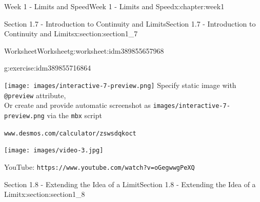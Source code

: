 \documentclass[oneside,10pt,]{book}
\newcommand{\mono}[1]{\texttt{#1}}
\numberwithin{equation}{section}
\newlength{\qrsize}
\newlength{\previewwidth}
\begin{document}
\begin{chapterptx}{Week 1 - Limits and Speed}{}{Week 1 - Limits and Speed}{}{}{x:chapter:week1}
\begin{sectionptx}{Section 1.7 - Introduction to Continuity and Limits}{}{Section 1.7 - Introduction to Continuity and Limits}{}{}{x:section:section1_7}
\begin{worksheet-subsection}{Worksheet}{}{Worksheet}{}{}{g:worksheet:idm389855657968}
\begin{divisionexercise}{3}{}{}{g:exercise:idm389855716864}
\begin{tcbraster}[raster columns=2, raster column skip=1pt, raster halign=center, raster force size=false, raster left skip=0pt, raster right skip=0pt]
\begin{tcolorbox}[previewstyle, width=\previewwidth]%
%
{\texttt{[image: images/interactive-7-preview.png]}}%
{\small{}Specify static image with \mono{@preview} attribute,\\Or create and provide automatic screenshot as \mono{images/interactive-7-preview.png} via the \mono{mbx} script}%
\end{tcolorbox}%
\begin{tcolorbox}[qrstyle]%
{\hypersetup{urlcolor=black}}%
\end{tcolorbox}%
\begin{tcolorbox}[captionstyle]%
\small \mono{www.desmos.com/calculator/zswsdqkoct}\end{tcolorbox}%
\end{tcbraster}%
%
\end{divisionexercise}%
\end{worksheet-subsection}
\restoregeometry
\setlength{\qrsize}{9em}
\setlength{\previewwidth}{\linewidth}
\addtolength{\previewwidth}{-\qrsize}
\begin{tcbraster}[raster columns=2, raster column skip=1pt, raster halign=center, raster force size=false, raster left skip=0pt, raster right skip=0pt]%
\begin{tcolorbox}[previewstyle, width=\previewwidth]%
\texttt{[image: images/video-3.jpg]}%
\end{tcolorbox}%
\begin{tcolorbox}[qrstyle]%
{\hypersetup{urlcolor=black}}%
\end{tcolorbox}%
\begin{tcolorbox}[captionstyle]%
\small YouTube: \mono{https://www.youtube.com/watch?v=oGegwwgPeXQ}\end{tcolorbox}%
\end{tcbraster}%
\end{sectionptx}
%
%
\typeout{************************************************}
\typeout{************************************************}
%
\begin{sectionptx}{Section 1.8 - Extending the Idea of a Limit}{}{Section 1.8 - Extending the Idea of a Limit}{}{}{x:section:section1_8}
\setlength{\qrsize}{9em}
\setlength{\previewwidth}{\linewidth}
\addtolength{\previewwidth}{-\qrsize}
\begin{tcbraster}[raster columns=2, raster column skip=1pt, raster halign=center, raster force size=false, raster left skip=0pt, raster right skip=0pt]%

\end{tcbraster}
\end{sectionptx}
\end{chapterptx}
\end{document}
